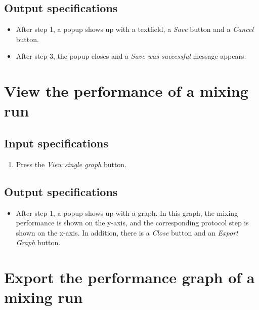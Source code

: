 \subsection*{Output specifications}
\begin{itemize}
\item After step 1, a popup shows up with a textfield, a \emph{Save} button and a \emph{Cancel} button.
\item After step 3, the popup closes and a \emph{Save was successful} message appears.
\end{itemize}

\section{View the performance of a mixing run}

\subsection*{Input specifications}
\begin{enumerate}
\item Press the \emph{View single graph} button.
\end{enumerate}

\subsection*{Output specifications}
\begin{itemize}
\item After step 1, a popup shows up with a graph. In this graph, the mixing performance is shown on the y-axis, and the corresponding protocol step is shown on the x-axis. In addition, there is a \emph{Close} button and an \emph{Export Graph} button.
\end{itemize}

\section{Export the performance graph of a mixing run}

